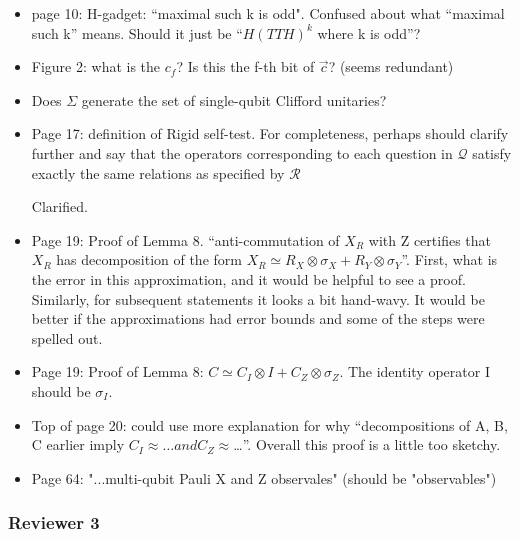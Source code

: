 \documentclass[12pt]{article}
\begin{document}
\begin{itemize}
\item page 10: H-gadget: “maximal such k is odd". Confused about what “maximal such k” means. Should it just be “$H(TTH)^k$ where k is odd”?

\item Figure 2: what is the $c_f$? Is this the f-th bit of $\vec{c}$? (seems redundant)

\item Does $\Sigma$ generate the set of single-qubit Clifford unitaries?

\item Page 17: definition of Rigid self-test. For completeness, perhaps should clarify further and say that the operators corresponding to each question in $\mathcal{Q}$ satisfy exactly the same relations as specified by $\mathcal{R}$

				{\color{blue} Clarified.}

\item Page 19: Proof of Lemma 8. “anti-commutation of $X_R$ with Z certifies that $X_R$ has decomposition of the form $X_R \simeq R_X \otimes \sigma_X + R_Y \otimes \sigma_Y$”. First, what is the error in this approximation, and it would be helpful to see a proof. Similarly, for subsequent statements it looks a bit hand-wavy. It would be better if the approximations had error bounds and some of the steps were spelled out. 

\item Page 19: Proof of Lemma 8: $C \simeq C_I \otimes I + C_Z \otimes \sigma_Z$. The identity operator I should be $\sigma_I$. 

\item Top of page 20: could use more explanation for why “decompositions of A, B, C earlier imply $C_I \approx… and C_Z \approx$…”. Overall this proof is a little too sketchy.

\item Page 64: "...multi-qubit Pauli X and Z observales" (should be "observables")

\end{itemize}

\subsubsection*{Reviewer 3}
\end{document}
